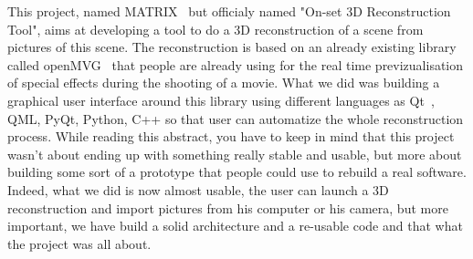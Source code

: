 \noindent
This project, named MATRIX~\cite{matrix} but officialy named "On-set 3D Reconstruction Tool", aims at developing a tool to do a 3D reconstruction of a scene from pictures of this scene. The 
reconstruction is based on an already existing library called openMVG~\cite{openMVG} that people are already using for the 
real time previzualisation of special effects during the shooting of a movie. What we did was building a graphical user
interface around this library using different languages as Qt~\cite{qt}, QML, PyQt, Python, C++ so that user can automatize 
the whole reconstruction process. While reading this abstract, you have to keep in mind that this project wasn't
about ending up with something really stable and usable, but more about building some sort of a prototype that 
people could use to rebuild a real software. Indeed, what we did is now almost usable, the user can launch
a 3D reconstruction and import pictures from his computer or his camera, but more important, we have build a 
solid architecture and a re-usable code and that what the project was all about.